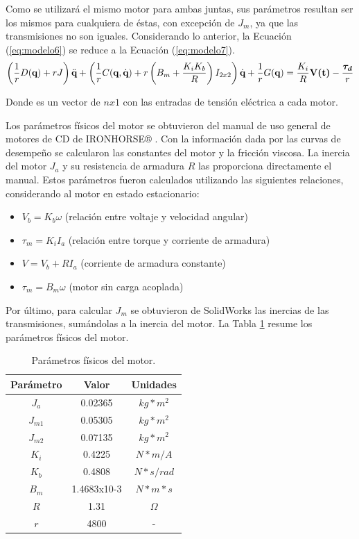 Como se utilizará el mismo motor para ambas juntas, sus parámetros resultan ser los mismos para cualquiera de éstas, con excepción de $ J_m $, ya que las transmisiones no son iguales. Considerando lo anterior, la Ecuación (\ref{eq:modelo6}) se reduce a la Ecuación (\ref{eq:modelo7}).
\begin{equation} \label{eq:modelo7}
    \left(\frac{1}{r} D(\textbf{q})+rJ\right)\Ddot{\textbf{q}} +\left(\frac{1}{r} C(\textbf{q},\Dot{\textbf{q}})+r\left(B_m+\frac{K_i K_b}{R}\right) I_{2x2} \right)\Dot{\textbf{q}}+\frac{1}{r} G(\textbf{q})=\frac{K_i}{R} \textbf{V(t)}-\frac{\bm{\tau_d}}{r}
\end{equation}

Donde  es un vector de $ nx1 $ con las entradas de tensión eléctrica a cada motor.

Los parámetros físicos del motor se obtuvieron del manual de uso general de motores de CD de IRONHORSE® \cite{DDA14}. Con la información dada por las curvas de desempeño se calcularon las constantes del motor y la fricción viscosa. La inercia del motor $ J_a $ y su resistencia de armadura $ R $ las proporciona directamente el manual. Estos parámetros fueron calculados utilizando las siguientes relaciones, considerando al motor en estado estacionario:

\begin{itemize}
    \item $ V_b=K_b \omega $ (relación entre voltaje y velocidad angular)
    \item $ \tau_m=K_i I_a $ (relación entre torque y corriente de armadura)
    \item $ V=V_b+RI_a $ (corriente de armadura constante)
    \item $ \tau_m=B_m \omega $ (motor sin carga acoplada)
\end{itemize}

Por último, para calcular $ J_m $ se obtuvieron de SolidWorks las inercias de las transmisiones, sumándolas a la inercia del motor. La Tabla \ref{tab:modelo2} resume los parámetros físicos del motor.

\begin{table}[H]
  \centering
  \caption{Parámetros físicos del motor.}
    \begin{tabular}{|c|c|c|}
    \hline
    \textbf{Parámetro} & \textbf{Valor} & \textbf{Unidades} \\
    \hline \hline
    $ J_a $  & 0.02365 & $ kg*m^2 $ \\
    \hline
    $ J_{m1} $  & 0.05305 & $ kg*m^2 $ \\
    \hline
    $ J_{m2} $  & 0.07135 & $ kg*m^2 $ \\
    \hline
    $ K_i $  & 0.4225 & $ N*m/A $ \\
    \hline
    $ K_b $  & 0.4808 & $ N*s/rad $ \\
    \hline
    $ B_m $  & 1.4683x10-3 & $ N*m*s $ \\
    \hline
    $ R $  & 1.31 & $ \Omega $ \\
    \hline
    $ r $  & 4800 & - \\
    \hline
    \end{tabular}%
  \label{tab:modelo2}%
\end{table}%

